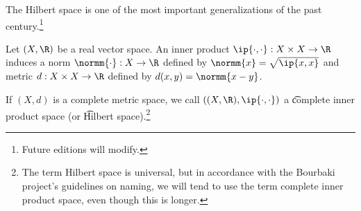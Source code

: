 

The Hilbert space is one of the most important generalizations of the past century.\footnote{Future editions will modify.}


Let $(X, \R)$ be a real vector space. An inner product $\ip{\cdot,\cdot}: X\times X \to \R$ induces a norm $\normm{\cdot}: X \to \R$ defined by $\normm{x} = \sqrt{\ip{x,x}}$ and metric $d: X \times X \to \R$ defined by $d(x, y) = \normm{x - y}$.

If $(X, d)$ is a complete metric space, we call $((X, \R), \ip{\cdot,\cdot})$ a \t{complete inner product space} (or \t{Hilbert space}).\footnote{The term Hilbert space is universal, but in accordance with the Bourbaki project's guidelines on naming, we will tend to use the term complete inner product space, even though this is longer.}

\blankpage
